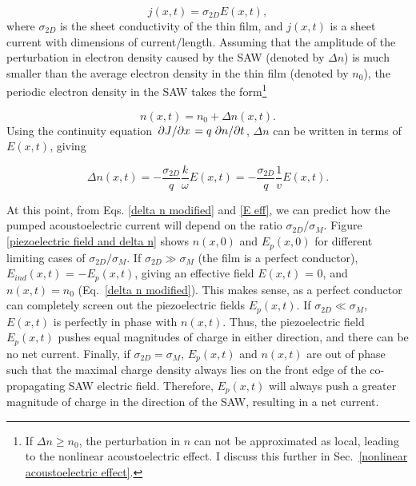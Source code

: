 \documentclass[double,12pt,1in,seploa]{beavtex}
\begin{document}
\begin{equation}
    j(x,t) = \sigma_{2D} E(x,t), \label{2D AE ohm's law}
\end{equation}
where $\sigma_{2D}$ is the sheet conductivity of the thin film, and $j(x,t)$ is a sheet current with dimensions of current/length. Assuming that the amplitude of the perturbation in electron density caused by the SAW (denoted by $\Delta n$) is much smaller than the average electron density in the thin film (denoted by $n_0$), the periodic electron density in the SAW takes the form\footnote{If $\Delta n \geq n_0$, the perturbation in $n$ can not be approximated as local, leading to the nonlinear acoustoelectric effect. I discuss this further in Sec.\ \ref{nonlinear acoustoelectric effect}.}


\begin{equation}
    n(x,t) = n_0 + \Delta n(x,t). 
\end{equation}
Using the continuity equation $\pdv*{J}{x} = q \pdv*{n}{t}$, $\Delta n$ can be written in terms of $E(x,t)$, giving

\begin{equation}
    \Delta n(x,t) = -\frac{\sigma_{2D}}{q} \frac{k}{\omega} E(x,t) = -\frac{\sigma_{2D}}{q} \frac{1}{v}E(x,t). \label{delta n modified}
\end{equation}

At this point, from Eqs. \ref{delta n modified} and \ref{E eff}, we can predict how the pumped acoustoelectric current will depend on the ratio $\sigma_{2D}/\sigma_M$. Figure \ref{piezoelectric field and delta n} shows $n(x,0)$ and $E_p(x,0)$ for different limiting cases of $\sigma_{2D}/\sigma_M$. If $\sigma_{2D} \gg \sigma_M$ (the film is a perfect conductor), $E_{ind}(x,t)$ = $-E_p(x,t)$, giving an effective field $E(x,t)$ = 0, and $n(x,t) = n_0$ (Eq.\ \ref{delta n modified}). This makes sense, as a perfect conductor can completely screen out the piezoelectric fields $E_p(x,t)$. If $\sigma_{2D} \ll \sigma_M$, $E(x,t)$ is perfectly in phase with $n(x,t)$. Thus, the piezoelectric field $E_p(x,t)$ pushes equal magnitudes of charge in either direction, and there can be no net current. Finally, if $\sigma_{2D} = \sigma_M$, $E_p(x,t)$ and $n(x,t)$ are out of phase such that the maximal charge density always lies on the front edge of the co-propagating SAW electric field. Therefore, $E_p(x,t)$ will always push a greater magnitude of charge in the direction of the SAW, resulting in a net current.


\end{document}
